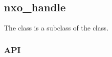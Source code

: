 %
%
%
%
%              

\subsection{nxo\_handle}
\label{nxo_handle}

The  class is a subclass of the  class.

\subsubsection{API}
